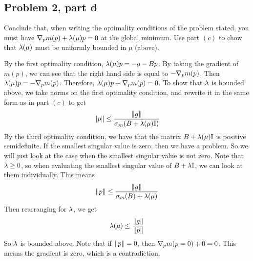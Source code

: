 \subsection{Problem 2, part d}
Conclude that, when writing the optimality conditions of the problem stated, you must have $\nabla_p m(p) + \mathrm{\lambda}(\mu)p = 0$ at the global minimum. Use part $(c)$ to chow that $\mathrm{\lambda}(\mu)$ must be uniformly bounded in $\mu$ (above).
\partbreak
\begin{solution}

    By the first optimality condition, $\mathrm{\lambda}(\mu)p = -g - Bp$. By taking the gradient of $m(p)$, we can see that the right hand side is equal to $-\nabla_p m(p)$. Then $\mathrm{\lambda}(\mu)p = -\nabla_p m(p)$. Therefore, $\mathrm{\lambda}(\mu)p + \nabla_p m(p)= 0$. To show that $\mathrm{\lambda}$ is bounded above, we take norms on the first optimality condition, and rewrite it in the same form as in part $(c)$ to get
    \[\norm{p} \leq \frac{\norm{g}}{\sigma_{m}(B + \mathrm{\lambda}(\mu)\mathbb{I} )}\]
    By the third optimality condition, we have that the matrix $B + \mathrm{\lambda}(\mu)\mathbb{I}$ is positive semidefinite. If the smallest singular value is zero, then we have a problem. So we will just look at the case when the smallest singular value is not zero. Note that $\mathrm{\lambda} \geq 0$, so when evaluating the smallest singular value of $B + \mathrm{\lambda} \mathbb{I}$, we can look at them individually. This means
    \[\norm{p} \leq \frac{\norm{g}}{\sigma_{m}(B) + \mathrm{\lambda}(\mu) }\]
    Then rearranging for $\mathrm{\lambda}$, we get
    \[\mathrm{\lambda}(\mu) \leq \frac{\norm{g}}{\norm{p}}\]
    So $\mathrm{\lambda}$ is bounded above. Note that if $\norm{p} = 0$, then $\nabla_p m(p = 0) + 0 = 0$. This means the gradient is zero, which is a contradiction.
\end{solution}
